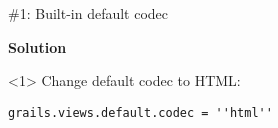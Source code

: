 \begin{frame}

    \vspace{.5cm}

    \begin{center}
      \Huge\color{red} \#1: Built-in default codec \\
    \end{center}

    \vspace{1cm}

    \Large
    \textbf{Solution} \\[1em]

    \begin{onlyenv}<1>
      Change default codec to HTML:
      \begin{center}
        \begin{minipage}{.9\textwidth}
          \begin{verbatim}
grails.views.default.codec = ''html''
          \end{verbatim}
        \end{minipage}
      \end{center}
    \end{onlyenv}

    \vfill

\end{frame}



